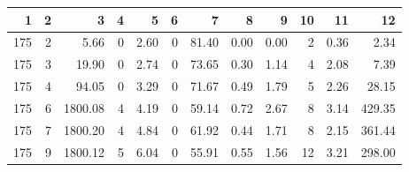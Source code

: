 \begin{tabular}{rrrrrrrrrrrr}
\toprule
1 & 2 & 3 & 4 & 5 & 6 & 7 & 8 & 9 & 10 & 11 & 12 \\
\midrule
175 & 2 & 5.66 & 0 & 2.60 & 0 & 81.40 & 0.00 & 0.00 & 2 & 0.36 & 2.34 \\
175 & 3 & 19.90 & 0 & 2.74 & 0 & 73.65 & 0.30 & 1.14 & 4 & 2.08 & 7.39 \\
175 & 4 & 94.05 & 0 & 3.29 & 0 & 71.67 & 0.49 & 1.79 & 5 & 2.26 & 28.15 \\
175 & 6 & 1800.08 & 4 & 4.19 & 0 & 59.14 & 0.72 & 2.67 & 8 & 3.14 & 429.35 \\
175 & 7 & 1800.20 & 4 & 4.84 & 0 & 61.92 & 0.44 & 1.71 & 8 & 2.15 & 361.44 \\
175 & 9 & 1800.12 & 5 & 6.04 & 0 & 55.91 & 0.55 & 1.56 & 12 & 3.21 & 298.00 \\
\bottomrule
\end{tabular}
